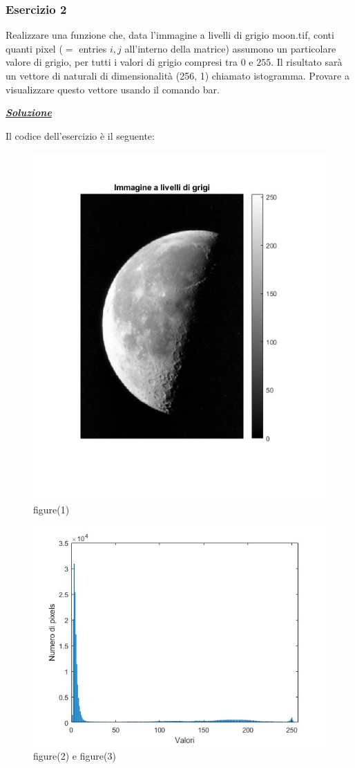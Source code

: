 \documentclass[a4paper]{article}
\begin{document}
	\subsubsection{Esercizio 2}

	Realizzare una funzione che, data l'immagine a livelli di grigio \textsf{moon.tif}, conti quanti pixel ($=$ entries $i,j$ all'interno della matrice) assumono un particolare valore di grigio, per tutti i valori di grigio compresi tra $0$ e $255$. Il risultato sarà un vettore di naturali di dimensionalità (256, 1) chiamato istogramma. Provare a visualizzare questo vettore usando il comando bar.\newline
	
	\noindent
	\textcolor{Green4}{\textbf{\underline{\emph{Soluzione}}}}\newline
	
	\noindent
	Il codice dell'esercizio è il seguente:
	\newpage
	
	\begin{figure}[!htp]
		\centering
		\includegraphics[width=.7\textwidth]{img/lab/lab2_ex2-fig1.jpg}
		\caption{\textsf{figure(1)}}
	\end{figure}
	\begin{figure}[!htp]
		\centering
		\includegraphics[width=.7\textwidth]{img/lab/lab2_ex2-fig2.jpg}
		\caption{\textsf{figure(2)} e \textsf{figure(3)}}
	\end{figure}
	\newpage
	
\end{document}
